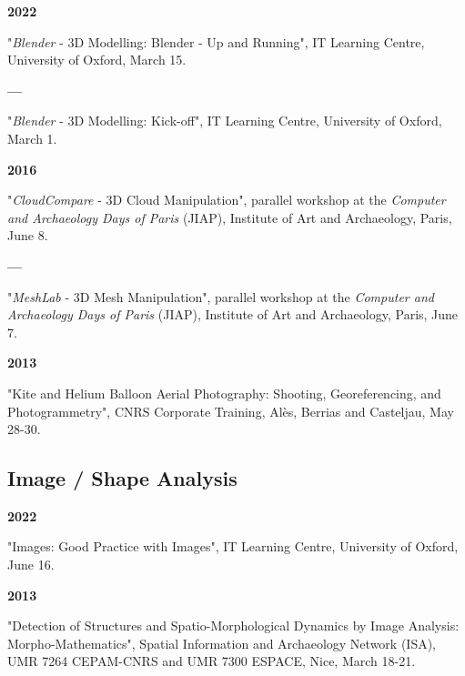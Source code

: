 \documentclass{article}
\newcommand{\fr}[1]{} %
\newcommand{\en}[1]{#1}   %
\begin{document}
\textbf{2022 }
\fr{"\textit{Blender} - 3d Modelling: Blender - Up and running", IT Learning Centre, University of Oxford, 15 Mars.}
\en{"\textit{Blender} - 3D Modelling: Blender - Up and Running", IT Learning Centre, University of Oxford, March 15.}

\smallbreak
\textbf{--- }
\fr{"\textit{Blender} - 3d modelling: Kick-off", IT Learning Centre, University of Oxford, 1 Mars.}
\en{"\textit{Blender} - 3D Modelling: Kick-off", IT Learning Centre, University of Oxford, March 1.}

\smallbreak
\textbf{2016 }
\fr{"\textit{CloudCompare} - manipulation de nuages 3D", atelier en parallèle des \textit{Journées informatique et archéologies de Paris} (JIAP), Institut d'Art et d'Archéologie, Paris, 8 Juin.}
\en{"\textit{CloudCompare} - 3D Cloud Manipulation", parallel workshop at the \textit{Computer and Archaeology Days of Paris} (JIAP), Institute of Art and Archaeology, Paris, June 8.}

\smallbreak
\textbf{--- }
\fr{"\textit{MeshLab} - manipulation de maillages 3D", atelier en parallèle des \textit{Journées informatique et archéologies de Paris} (JIAP), Institut d'Art et d'Archéologie, Paris, 7 Juin.}
\en{"\textit{MeshLab} - 3D Mesh Manipulation", parallel workshop at the \textit{Computer and Archaeology Days of Paris} (JIAP), Institute of Art and Archaeology, Paris, June 7.}

\smallbreak
\textbf{2013 }
\fr{"Photographie aérienne par cerf-volant et ballon à hélium : prise de vue, géoréférencement et photogrammétrie", CNRS formation entreprises, Alès, Berrias et Casteljau, 28-30 Mai.}
\en{"Kite and Helium Balloon Aerial Photography: Shooting, Georeferencing, and Photogrammetry", CNRS Corporate Training, Alès, Berrias and Casteljau, May 28-30.}

\smallbreak

\subsection*{\fr{Image / Analyse de forme}\en{Image / Shape Analysis}}

\textbf{2022 }
\fr{"Images: Good Practice with Images", IT Learning Centre, University of Oxford, 16 Juin.}
\en{"Images: Good Practice with Images", IT Learning Centre, University of Oxford, June 16.}

\smallbreak
\textbf{2013 }
\fr{"Detection of structures and spatio-morphological dynamics by image analyses: morpho-mathematics", réseau \textit{Information Spatiale et Archéologie} (ISA), UMR 7264 CEPAM-CNRS and UMR 7300 ESPACE, Nice, 18-21 Mars.}
\en{"Detection of Structures and Spatio-Morphological Dynamics by Image Analysis: Morpho-Mathematics", Spatial Information and Archaeology Network (ISA), UMR 7264 CEPAM-CNRS and UMR 7300 ESPACE, Nice, March 18-21.}
\end{document}
